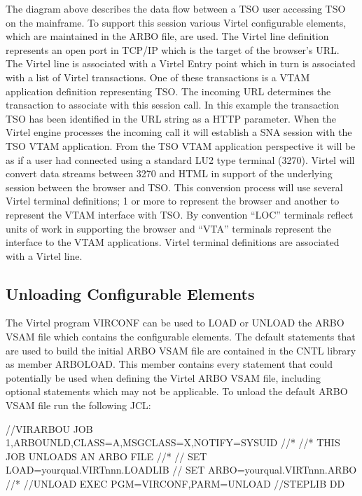 \documentclass[letterpaper,10pt,english]{sphinxmanual}
\begin{document}
\sphinxAtStartPar
The diagram above describes the data flow between a TSO user accessing TSO on the mainframe. To support this session various Virtel configurable elements, which are maintained in the ARBO file, are used. The Virtel line definition represents an open port in TCP/IP which is the target of the browser’s URL. The Virtel line is associated with a Virtel Entry point which in turn is associated with a list of Virtel transactions. One of these transactions is a VTAM application definition representing TSO. The incoming URL determines the transaction to associate with this session call. In this example the transaction TSO has been identified in the URL string as a HTTP parameter. When the Virtel engine processes the incoming call it will establish a SNA session with the TSO VTAM application. From the TSO VTAM application perspective it will be as if a user had connected using a standard LU2 type terminal (3270). Virtel will convert data streams between 3270 and HTML in support of the underlying session between the browser and TSO. This conversion process will use several Virtel terminal definitions; 1 or more to represent the browser and another to represent the VTAM interface with TSO. By convention “LOC” terminals reflect units of work in supporting the browser and “VTA” terminals represent the interface to the VTAM applications. Virtel terminal definitions are associated with a Virtel line.


\subsection{Unloading Configurable Elements}
\label{\detokenize{connectivity_guide:unloading-configurable-elements}}
\sphinxAtStartPar
The Virtel program VIRCONF can be used to LOAD or UNLOAD the ARBO VSAM file which contains the configurable elements. The default statements that are used to build the initial ARBO VSAM file are contained in the CNTL library as member ARBOLOAD. This member contains every statement that could potentially be used when defining the Virtel ARBO VSAM file, including optional statements which may not be applicable. To unload the default ARBO VSAM file run the following JCL:\sphinxhyphen{}

\begin{sphinxVerbatim}[commandchars=\\\{\}]
//VIRARBOU JOB 1,ARBOUNLD,CLASS=A,MSGCLASS=X,NOTIFY=\PYGZam{}SYSUID
//*
//* THIS JOB UNLOADS AN ARBO FILE
//*
// SET LOAD=yourqual.VIRTnnn.LOADLIB
// SET ARBO=yourqual.VIRTnnn.ARBO
//*
//UNLOAD  EXEC PGM=VIRCONF,PARM=UNLOAD
//STEPLIB  DD  DSN=\PYGZam{}LOAD,DISP=SHR
//SYSPRINT DD  SYSOUT=*
//SYSUDUMP DD  SYSOUT=*
//VIRARBO  DD  DSN=\PYGZam{}ARBO,DISP=SHR,AMP=(\PYGZsq{}RMODE31=NONE\PYGZsq{})
//SYSPUNCH DD  DSN=\PYGZam{}SYSUID..VIRCONF.SYSIN,DISP=(,CATLG),
//             UNIT=SYSDA,VOL=SER=??????,SPACE=(TRK,(5,1)),
//             DCB=(RECFM=FB,LRECL=80,BLKSIZE=6080)
\end{sphinxVerbatim}
\end{document}
